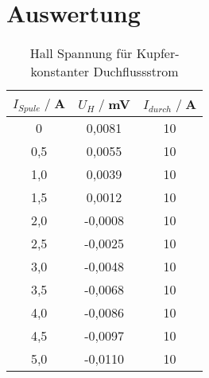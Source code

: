 \newpage
\section{Auswertung}




\begin{table}
    \centering
    \begin{tabular}{c c c}
        \toprule
        $I_{Spule} \;/\;$A & $U_H\;/\;$mV & $I_{durch} \;/\;$A\\
        \midrule
        0                   &0,0081              &10\\
        0,5                 &0,0055              &10\\
        1,0                 &0,0039              &10\\
        1,5                 &0,0012              &10\\
        2,0                 &-0,0008             &10\\
        2,5                 &-0,0025             &10\\
        3,0                 &-0,0048             &10\\
        3,5                 &-0,0068             &10\\
        4,0                 &-0,0086             &10\\
        4,5                 &-0,0097             &10\\
        5,0                 &-0,0110             &10\\
        \bottomrule
    \end{tabular}
    \caption{Hall Spannung für Kupfer- konstanter Duchflussstrom}
    \label{tab:Cu_B}
\end{table}





